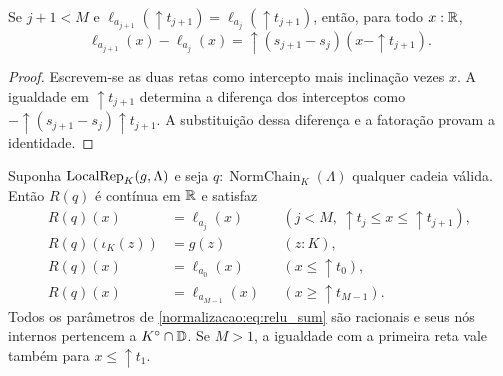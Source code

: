 \begin{lema}\label{map:normalizacao:8.3}\label{normalizacao:lem:incident}
Se $j+1<M$ e
$\ell_{a_{j+1}}(\uparrow t_{j+1})=
 \ell_{a_j}(\uparrow t_{j+1})$, então, para todo $x:\mathbb R$,
\[
 \ell_{a_{j+1}}(x)-\ell_{a_j}(x)
   =\uparrow(s_{j+1}-s_j)(x-\uparrow t_{j+1}).
\]
\end{lema}
\begin{proof}
Escrevem-se as duas retas como intercepto mais inclinação vezes $x$.
A igualdade em $\uparrow t_{j+1}$ determina a diferença dos
interceptos como $-\uparrow(s_{j+1}-s_j)\uparrow t_{j+1}$.
A substituição dessa diferença e a fatoração provam a identidade.
\end{proof}

\begin{teorema}\label{map:normalizacao:8.4}\label{normalizacao:thm:extension}
Suponha $\operatorname{LocalRep}_K(g,\Lambda)$ e seja
$q:\operatorname{NormChain}_K(\Lambda)$ qualquer cadeia válida.
Então $R(q)$ é contínua em $\mathbb R$ e satisfaz
\begin{align*}
 R(q)(x)&=\ell_{a_j}(x)
            &&(j<M,\ \uparrow t_j\le x\le\uparrow t_{j+1}),\\
 R(q)(\iota_K(z))&=g(z)&& (z:K),\\
 R(q)(x)&=\ell_{a_0}(x)&& (x\le\uparrow t_0),\\
 R(q)(x)&=\ell_{a_{M-1}}(x)&& (x\ge\uparrow t_{M-1}).
\end{align*}
Todos os parâmetros de \eqref{normalizacao:eq:relu_sum} são racionais e seus
nós internos pertencem a $K^\circ\cap\mathbb D$. Se $M>1$, a igualdade
com a primeira reta vale também para $x\le\uparrow t_1$.
\end{teorema}
